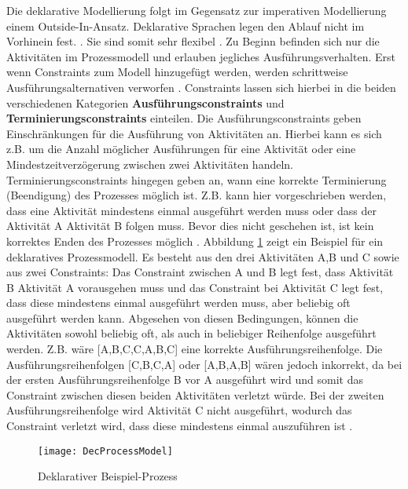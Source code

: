  Die deklarative Modellierung folgt im Gegensatz zur imperativen Modellierung einem \grqq Outside-In-Ansatz\grqq  \cite{lichtenegger2012}. Deklarative Sprachen legen den Ablauf nicht im Vorhinein fest. \cite{pichler2012}. Sie sind somit sehr flexibel \cite{reichert2012}. Zu Beginn befinden sich nur die Aktivitäten im Prozessmodell und erlauben jegliches Ausführungsverhalten. Erst wenn Constraints zum Modell hinzugefügt werden, werden schrittweise Ausführungsalternativen verworfen \cite{pichler2012}. Constraints lassen sich hierbei in die beiden verschiedenen Kategorien \textbf{Ausführungsconstraints} und \textbf{Terminierungsconstraints} einteilen. Die Ausführungsconstraints geben Einschränkungen für die Ausführung von Aktivitäten an. Hierbei kann es sich z.B. um die Anzahl möglicher Ausführungen für eine Aktivität oder eine Mindestzeitverzögerung zwischen zwei Aktivitäten handeln. Terminierungsconstraints hingegen geben an, wann eine korrekte Terminierung (Beendigung) des Prozesses möglich ist. Z.B. kann hier vorgeschrieben werden, dass eine Aktivität mindestens einmal ausgeführt werden muss oder dass der Aktivität A Aktivität B folgen muss. Bevor dies nicht geschehen ist, ist kein korrektes Enden des Prozesses möglich \cite{reichert2012}.  Abbildung \ref{fig:Dec} zeigt ein Beispiel für ein deklaratives Prozessmodell. Es besteht aus den drei Aktivitäten A,B und C sowie aus zwei Constraints:  Das Constraint zwischen A und B legt fest, dass Aktivität B Aktivität A vorausgehen muss und das Constraint bei Aktivität C legt fest, dass diese mindestens einmal ausgeführt werden muss, aber beliebig oft ausgeführt werden kann. Abgesehen von diesen Bedingungen, können die Aktivitäten sowohl beliebig oft, als auch in beliebiger Reihenfolge ausgeführt werden. Z.B. wäre [A,B,C,C,A,B,C] eine korrekte Ausführungsreihenfolge. Die Ausführungsreihenfolgen [C,B,C,A] oder [A,B,A,B] wären jedoch inkorrekt, da bei der ersten Ausführungsreihenfolge B vor A ausgeführt wird und somit das Constraint zwischen diesen beiden Aktivitäten verletzt würde. Bei der zweiten Ausführungsreihenfolge wird Aktivität C nicht ausgeführt, wodurch das Constraint verletzt wird, dass diese mindestens einmal auszuführen ist \cite{reichert2012}. \newline

\begin{figure}[H]
\begin{center}
  \texttt{[image: DecProcessModel]} %
  \caption{Deklarativer Beispiel-Prozess}
  \label{fig:Dec}
\end{center}
\end{figure} 

